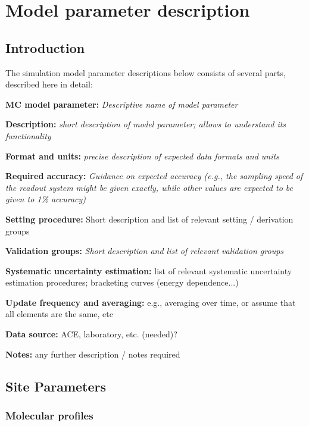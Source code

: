 \section{Model parameter description}
\label{sect:ModelParameterDescription}

\subsection{Introduction}

The simulation model parameter descriptions below consists of several parts, described here in detail:

\textbf{MC model parameter:} \textit{Descriptive name of model parameter}

\textbf{Description:} \textit{short description of model parameter; allows to understand its functionality}

\textbf{Format and units:} \textit{precise description of expected data formats and units}

\textbf{Required accuracy:} \textit{Guidance on expected accuracy (e.g., the sampling speed of the readout system might be given exactly, while other values are expected to be given to 1\% accuracy)}

\textbf{Setting procedure:}
Short description and list of relevant setting / derivation groups

\textbf{Validation groups:} \textit{Short description and list of relevant validation groups}

\textbf{Systematic uncertainty estimation:}
list of relevant systematic uncertainty estimation procedures; bracketing curves (energy dependence...) 

\textbf{Update frequency and averaging:}
e.g., averaging over time, or assume that all elements are the same, etc

\textbf{Data source:}
ACE, laboratory, etc. (needed)?

\textbf{Notes:}
 any further description / notes required



\subsection{Site Parameters}

\subsubsection{Molecular profiles}

